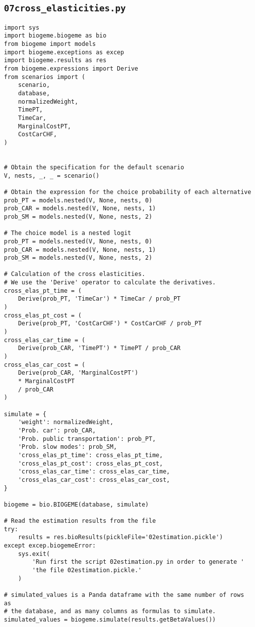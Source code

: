 \documentclass[12pt,a4paper]{article}
\begin{document}
\subsection{\lstinline$07cross_elasticities.py$}\label{sec:07cross_elasticities}
\begin{lstlisting}[style=numbers]
import sys
import biogeme.biogeme as bio
from biogeme import models
import biogeme.exceptions as excep
import biogeme.results as res
from biogeme.expressions import Derive
from scenarios import (
    scenario,
    database,
    normalizedWeight,
    TimePT,
    TimeCar,
    MarginalCostPT,
    CostCarCHF,
)


# Obtain the specification for the default scenario
V, nests, _, _ = scenario()

# Obtain the expression for the choice probability of each alternative
prob_PT = models.nested(V, None, nests, 0)
prob_CAR = models.nested(V, None, nests, 1)
prob_SM = models.nested(V, None, nests, 2)

# The choice model is a nested logit
prob_PT = models.nested(V, None, nests, 0)
prob_CAR = models.nested(V, None, nests, 1)
prob_SM = models.nested(V, None, nests, 2)

# Calculation of the cross elasticities.
# We use the 'Derive' operator to calculate the derivatives.
cross_elas_pt_time = (
    Derive(prob_PT, 'TimeCar') * TimeCar / prob_PT
)
cross_elas_pt_cost = (
    Derive(prob_PT, 'CostCarCHF') * CostCarCHF / prob_PT
)
cross_elas_car_time = (
    Derive(prob_CAR, 'TimePT') * TimePT / prob_CAR
)
cross_elas_car_cost = (
    Derive(prob_CAR, 'MarginalCostPT')
    * MarginalCostPT
    / prob_CAR
)

simulate = {
    'weight': normalizedWeight,
    'Prob. car': prob_CAR,
    'Prob. public transportation': prob_PT,
    'Prob. slow modes': prob_SM,
    'cross_elas_pt_time': cross_elas_pt_time,
    'cross_elas_pt_cost': cross_elas_pt_cost,
    'cross_elas_car_time': cross_elas_car_time,
    'cross_elas_car_cost': cross_elas_car_cost,
}

biogeme = bio.BIOGEME(database, simulate)

# Read the estimation results from the file
try:
    results = res.bioResults(pickleFile='02estimation.pickle')
except excep.biogemeError:
    sys.exit(
        'Run first the script 02estimation.py in order to generate '
        'the file 02estimation.pickle.'
    )

# simulated_values is a Panda dataframe with the same number of rows as
# the database, and as many columns as formulas to simulate.
simulated_values = biogeme.simulate(results.getBetaValues())


\end{lstlisting}
\end{document}
